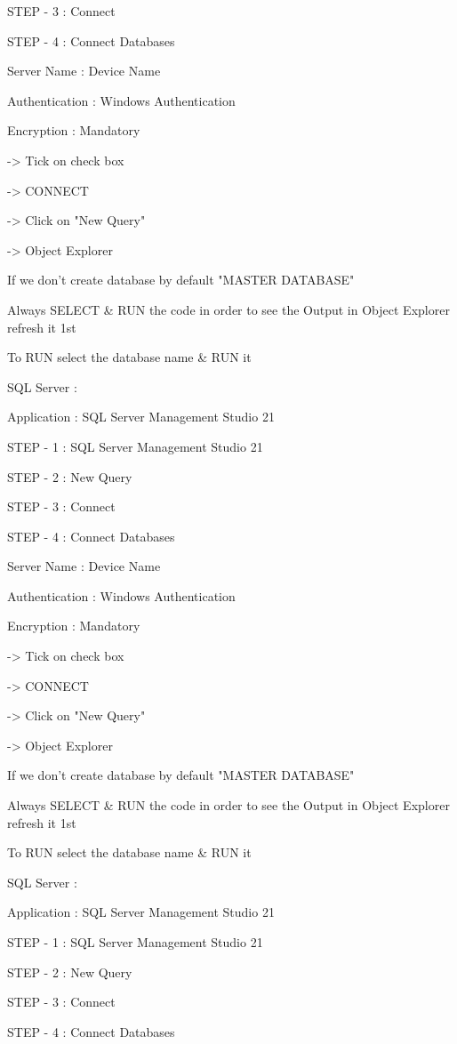 STEP - 3 : Connect

STEP - 4 : Connect Databases


Server Name : Device Name

Authentication : Windows Authentication

Encryption : Mandatory

-> Tick on check box

-> CONNECT

-> Click on "New Query"

-> Object Explorer


If we don't create database by default "MASTER DATABASE"


Always SELECT & RUN the code in order to see the Output in Object Explorer refresh it 1st


To RUN select the database name & RUN it

SQL Server :

Application : SQL Server Management Studio 21

STEP - 1 : SQL Server Management Studio 21

STEP - 2 : New Query

STEP - 3 : Connect

STEP - 4 : Connect Databases


Server Name : Device Name

Authentication : Windows Authentication

Encryption : Mandatory

-> Tick on check box

-> CONNECT

-> Click on "New Query"

-> Object Explorer


If we don't create database by default "MASTER DATABASE"


Always SELECT & RUN the code in order to see the Output in Object Explorer refresh it 1st


To RUN select the database name & RUN it

SQL Server :

Application : SQL Server Management Studio 21

STEP - 1 : SQL Server Management Studio 21

STEP - 2 : New Query

STEP - 3 : Connect

STEP - 4 : Connect Databases


